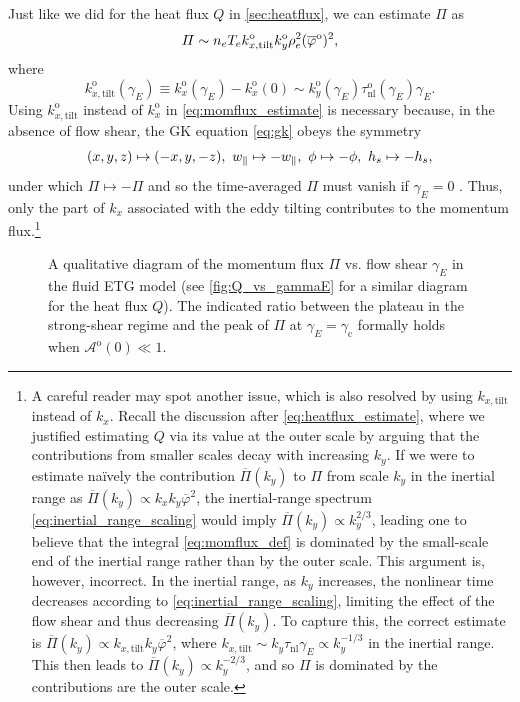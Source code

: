 \documentclass{jpp}
\newcommand{\taunl}{\tau_\text{nl}}
\newcommand{\taunlo}{\tau_\text{nl}^\text{o}}
\newcommand{\phinorm}{\varphi}
\newcommand{\phinormk}{\overline{\phinorm}}
\newcommand{\phinormko}{\overline{\phinorm}^\text{o}}
\newcommand{\kxo}{k_x^\text{o}}
\newcommand{\kxotilt}{k_{x, \text{tilt}}^\text{o}}
\newcommand{\kyo}{k_y^\text{o}}
\newcommand{\kxoO}{k_{x}^\text{o}(0)}
\newcommand{\gammaani}{\gamma_{\text{c}}}
\newcommand{\gammaE}{\gamma_{E}}
\newcommand{\A}{\mathcal{A}}
\newcommand{\AoO}{\A^\text{o}(0)}
\begin{document}
Just like we did for the heat flux \(Q\) in \cref{sec:heatflux}, we can estimate \(\Pi\) as
\begin{equation}
	\Pi \sim n_{e} T_{e} \kxotilt \kyo \rhoe^2 (\phinormko)^2,
	\label{eq:momflux_estimate}
\end{equation}
where
\begin{equation}
	\kxotilt(\gammaE) \equiv \kxo(\gammaE) - \kxoO \sim \kyo(\gammaE)\taunlo(\gammaE)\gammaE.
	\label{eq:kxotilt}
\end{equation}
Using \(\kxotilt\) instead of \(\kxo\) in \cref{eq:momflux_estimate} is necessary because, in the absence of flow shear, the GK equation \cref{eq:gk} obeys the symmetry
\begin{equation}
	(x, y, z) \mapsto (-x, y, -z), \ w_\parallel \mapsto -w_\parallel, \ \phi \mapsto -\phi, \ h_s \mapsto -h_s,
	\label{eq:updown_symmetry}
\end{equation}
under which \(\Pi \mapsto -\Pi\) and so the time-averaged \(\Pi\) must vanish if \(\gammaE = 0\) \citep{parra11, sugama11, fox17}. Thus, only the part of \(k_x\) associated with the eddy tilting contributes to the momentum flux.\footnote{A careful reader may spot another issue, which is also resolved by using \(k_{x,\text{tilt}}\) instead of \(k_x\). Recall the discussion after \cref{eq:heatflux_estimate}, where we justified estimating \(Q\) via its value at the outer scale by arguing that the contributions from smaller scales decay with increasing \(k_y\). If we were to estimate {na\"ively} the contribution \(\overline{\Pi}(k_y)\) to \(\Pi\) from scale \(k_y\) in the inertial range as \(\overline{\Pi}(k_y) \propto k_x k_y \phinormk^2\), the inertial-range spectrum \cref{eq:inertial_range_scaling} would imply \(\overline{\Pi}(k_y) \propto k_y^{2/3}\), leading one to believe that the integral \cref{eq:momflux_def} is dominated by the small-scale end of the inertial range rather than by the outer scale. This argument is, however, incorrect. In the inertial range, as \(k_y\) increases, the nonlinear time decreases according to \cref{eq:inertial_range_scaling}, limiting the effect of the flow shear and thus decreasing \(\overline{\Pi}(k_y)\). To capture this, the correct estimate is \(\overline{\Pi}(k_y) \propto k_{x, \text{tilt}} k_y \phinormk^2\), where \(k_{x, \text{tilt}} \sim k_y \taunl \gammaE \propto k_y^{-1/3}\) in the inertial range. This then leads to \(\overline{\Pi}(k_y) \propto k_y^{-2/3}\), and so \(\Pi\) is dominated by the contributions are the outer scale.}

\begin{figure}
	\centering
	\scalebox{1.0}{}
	\caption{A qualitative diagram of the momentum flux \(\Pi\) vs. flow shear \(\gammaE\) in the fluid ETG model (see \cref{fig:Q_vs_gammaE} for a similar diagram for the heat flux \(Q\)). The indicated ratio between the plateau in the strong-shear regime and the peak of \(\Pi\) at \(\gammaE=\gammaani\) formally holds when \(\AoO \ll 1\). }
	\label{fig:momflux}
\end{figure}
\end{document}
